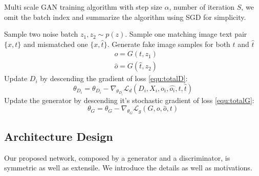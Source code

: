 \documentclass[10pt,twocolumn,letterpaper]{article}
\begin{document}
 \begin{algorithm}
 	\caption{Multi scale GAN training algorithm with step size $\alpha$, number of iteration $S$, we omit the batch index and summarize the algorithm using SGD for simplicity.}
 	\label{CHalgorithm}
 	\begin{algorithmic}[1]
 		\State Sample two noise batch $z_1, z_2 \sim p(z)$.
 		\State Sample one matching image text pair $\{x, t\}$ and mismatched one $\{x, \hat{t}\}$.
 		\State Generate fake image samples for both $t$ and $\hat{t}$
 		\begin{equation}
 		\begin{split}
	 		& {o} = G(t, z_1) \\
	 		& {\hat{o}} = G(\hat{t}, z_2) 
 		\end{split}
 		\end{equation}
		 		\State Update $D_i$ by descending the gradient of loss \ref{equ:totalD}:
		 		\begin{equation}
		 		   	\theta_{D_i} = \theta_{D_i}  - \nabla_{\theta_{D_i}} \mathcal{L}_d(D_i, X_i,o_i,\hat{o_i}, t,\hat{t})
		 		\end{equation}
	 		\EndFor
 		\EndFor
 		\State Update the generator by descending it's stochastic gradient of loss \ref{equ:totalG}:
 		\begin{equation}
 		\theta_{G} = \theta_{G}  - \nabla_{\theta_{G}} \mathcal{L}_g(G, o, \hat{o}, t)
 		\end{equation}
 		
 		
 		\EndFor
 		
 	\end{algorithmic}
 \end{algorithm}
 

\subsection{Architecture Design}
Our proposed network, composed by a generator and a discriminator, is symmetric as well as extensile. We introduce the details as well as motivations.
\end{document}
